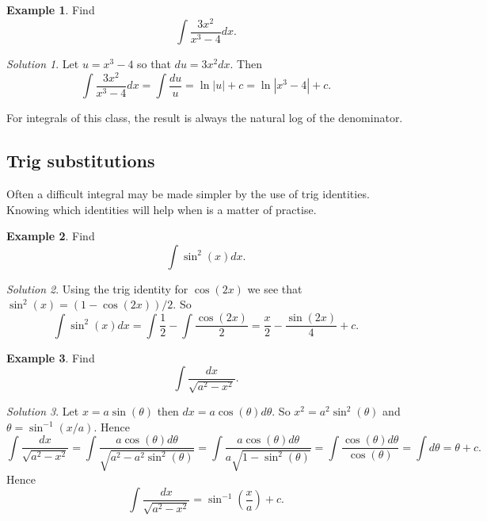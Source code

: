 \documentclass[
  11pt,
  oneside]{book}
\newcommand{\slide}{}
\newcommand{\cpybx}{}
\newcommand{\ecpybx}{}
\theoremstyle{definition}
\theoremstyle{definition}
\newtheorem{example}{Example}[chapter]
\theoremstyle{definition}
\theoremstyle{definition}
\theoremstyle{remark}
\newtheorem*{solution}{Solution}
\begin{document}
\cpybx

\begin{example}
Find
\[
\int\frac{3x^2}{x^3-4}dx.
\]
\end{example}

\ecpybx\slide\copy\copybox

\begin{solution}
Let \(u = x^3-4\) so that \(du = 3x^2dx\). Then
\[
\int\frac{3x^2}{x^3-4}dx = \int \frac{du}{u} = \ln|u|+c = \ln|x^3-4|+c.
\]
\end{solution}

For integrals of this class, the result is always the natural log of the denominator.
\slide

\subsection{Trig substitutions}\label{trig-substitutions}

Often a difficult integral may be made simpler by the use of trig identities. Knowing which identities will help when is a matter of practise.

\begin{example}
Find
\[
\int\sin^2(x) dx.
\]
\end{example}

\begin{solution}
Using the trig identity for \(\cos(2x)\) we see that \(\sin^2(x) = (1-\cos(2x))/2\). So
\[
\int\sin^2(x) dx = \int\frac 12-\int\frac{\cos(2x)}{2} = \frac x2-\frac{\sin(2x)}{4}+c.
\]
\end{solution}

\slide

\cpybx

\begin{example}
Find
\[
\int\frac{dx}{\sqrt{a^2-x^2}}.
\]
\end{example}

\ecpybx\slide\copy\copybox

\begin{solution}
Let \(x = a\sin(\theta)\) then \(dx = a\cos(\theta)d\theta\). So \(x^2 = a^2\sin^2(\theta)\) and \(\theta = \sin^{-1}(x/a)\). Hence
\[
\int\frac{dx}{\sqrt{a^2-x^2}} = \int\frac{a\cos(\theta)d\theta}{\sqrt{a^2-a^2\sin^2(\theta)}} = \int\frac{a\cos(\theta)d\theta}{a\sqrt{1-\sin^2(\theta)}} = \int\frac{\cos(\theta)d\theta}{\cos(\theta)} = \int d\theta = \theta + c.
\]
Hence
\[
\int\frac{dx}{\sqrt{a^2-x^2}} = \sin^{-1}\left(\frac xa\right) + c.
\]
\end{solution}
\end{document}
